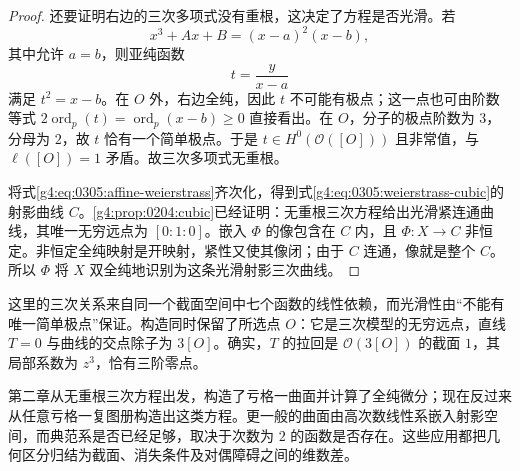 \begin{proof}
	还要证明右边的三次多项式没有重根，这决定了方程是否光滑。若
	\[
		x^3+Ax+B=(x-a)^2(x-b),
	\]
	其中允许 \(a=b\)，则亚纯函数
	\[
		t=\frac{y}{x-a}
	\]
	满足 \(t^2=x-b\)。在 \(O\) 外，右边全纯，因此 \(t\) 不可能有极点；这一点也可由阶数等式 \(2\operatorname{ord}_p(t)=\operatorname{ord}_p(x-b)\ge0\) 直接看出。在 \(O\)，分子的极点阶数为 \(3\)，分母为 \(2\)，故 \(t\) 恰有一个简单极点。于是 \(t\in H^0(\mathcal O([O]))\) 且非常值，与 \(\ell([O])=1\) 矛盾。故三次多项式无重根。

	将式\eqref{g4:eq:0305:affine-weierstrass}齐次化，得到式\eqref{g4:eq:0305:weierstrass-cubic}的射影曲线 \(C\)。\cref{g4:prop:0204:cubic}已经证明：无重根三次方程给出光滑紧连通曲线，其唯一无穷远点为 \([0:1:0]\)。嵌入 \(\Phi\) 的像包含在 \(C\) 内，且 \(\Phi:X\to C\) 非恒定。非恒定全纯映射是开映射，紧性又使其像闭；由于 \(C\) 连通，像就是整个 \(C\)。所以 \(\Phi\) 将 \(X\) 双全纯地识别为这条光滑射影三次曲线。
\end{proof}

这里的三次关系来自同一个截面空间中七个函数的线性依赖，而光滑性由“不能有唯一简单极点”保证。构造同时保留了所选点 \(O\)：它是三次模型的无穷远点，直线 \(T=0\) 与曲线的交点除子为 \(3[O]\)。确实，\(T\) 的拉回是 \(\mathcal O(3[O])\) 的截面 \(1\)，其局部系数为 \(z^3\)，恰有三阶零点。

\ProseParagraphBreak

第二章从无重根三次方程出发，构造了亏格一曲面并计算了全纯微分；现在反过来从任意亏格一复图册构造出这类方程。更一般的曲面由高次数线性系嵌入射影空间，而典范系是否已经足够，取决于次数为 \(2\) 的函数是否存在。这些应用都把几何区分归结为截面、消失条件及对偶障碍之间的维数差。
